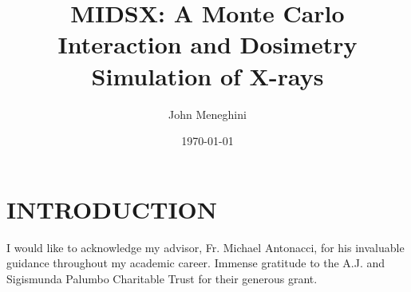 \documentclass[%
 aip,
cp,  %
 amsmath,amssymb,%
 preprint,%
]{revtex4-2}
\begin{document}
\title{MIDSX: A Monte Carlo Interaction and Dosimetry Simulation of X-rays}%

\author{John Meneghini} %

\date{\today} %

\begin{abstract}

\end{abstract}

\maketitle

\section{INTRODUCTION}







% 










\begin{acknowledgments}
    I would like to acknowledge my advisor, Fr. Michael Antonacci, for his invaluable guidance throughout my academic career. Immense gratitude to the A.J. and Sigismunda Palumbo Charitable Trust for their generous grant.
\end{acknowledgments}


\end{document}
